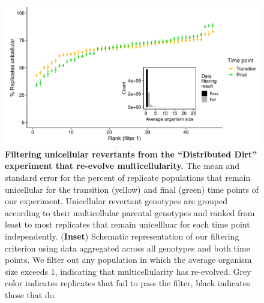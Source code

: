 \documentclass[
]{book}
\begin{document}
\begin{figure}
\centering
\includegraphics{images/Figure_S11_Dist_dirt_Populations_that_re-evolve_multicellularity_NEW_14MAR23.png}
\caption{\label{fig:dd-filter-1-reevolving-multicellularity}\textbf{Filtering unicellular revertants from the ``Distributed Dirt'' experiment that re-evolve multicellularity.} The mean and standard error for the percent of replicate populations that remain unicellular for the transition (yellow) and final (green) time points of our experiment. Unicellular revertant genotypes are grouped according to their multicellular parental genotypes and ranked from least to most replicates that remain unicellluar for each time point independently. (\textbf{Inset}) Schematic representation of our filtering criterion using data aggregated across all genotypes and both time points. We filter out any population in which the average organism size exceeds 1, indicating that multicellularity has re-evolved. Grey color indicates replicates that fail to pass the filter, black indicates those that do.}
\end{figure}
\end{document}
